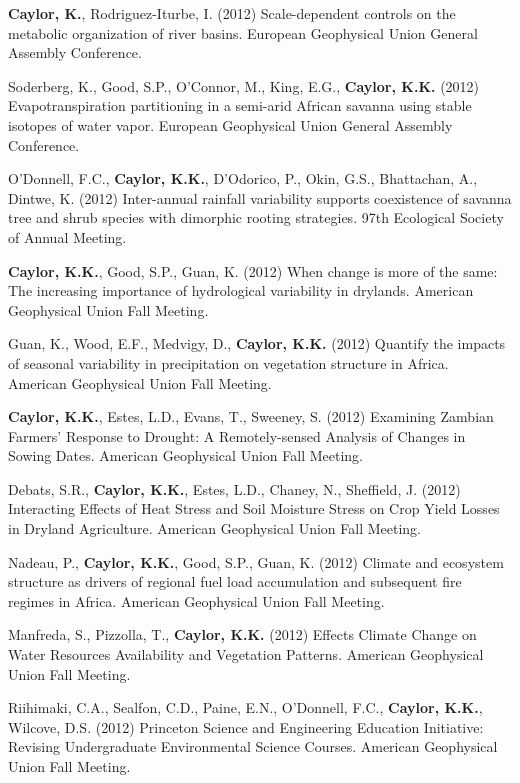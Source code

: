 \begin{etaremune}
\item \textbf{ Caylor, K.}, Rodriguez-Iturbe, I. (2012) Scale-dependent controls on the metabolic organization of river basins. European Geophysical Union General Assembly Conference.
\item Soderberg, K., Good, S.P., O'Connor, M., King, E.G., \textbf{ Caylor, K.K.} (2012) Evapotranspiration partitioning in a semi-arid African savanna using stable isotopes of water vapor. European Geophysical Union General Assembly Conference.
\item O'Donnell, F.C., \textbf{ Caylor, K.K.}, D'Odorico, P., Okin, G.S., Bhattachan, A., Dintwe, K. (2012) Inter-annual rainfall variability supports coexistence of savanna tree and shrub species with dimorphic rooting strategies. 97th Ecological Society of Annual Meeting.
\item \textbf{ Caylor, K.K.}, Good, S.P., Guan, K. (2012) When change is more of the same: The increasing importance of hydrological variability in drylands. American Geophysical Union Fall Meeting.
\item Guan, K., Wood, E.F., Medvigy, D., \textbf{ Caylor, K.K.} (2012) Quantify the impacts of seasonal variability in precipitation on vegetation structure in Africa. American Geophysical Union Fall Meeting.
\item \textbf{ Caylor, K.K.}, Estes, L.D., Evans, T., Sweeney, S. (2012) Examining Zambian Farmers' Response to Drought: A Remotely-sensed Analysis of Changes in Sowing Dates. American Geophysical Union Fall Meeting.
\item Debats, S.R., \textbf{ Caylor, K.K.}, Estes, L.D., Chaney, N., Sheffield, J. (2012) Interacting Effects of Heat Stress and Soil Moisture Stress on Crop Yield Losses in Dryland Agriculture. American Geophysical Union Fall Meeting.
\item Nadeau, P., \textbf{ Caylor, K.K.}, Good, S.P., Guan, K. (2012) Climate and ecosystem structure as drivers of regional fuel load accumulation and subsequent fire regimes in Africa. American Geophysical Union Fall Meeting.
\item Manfreda, S., Pizzolla, T., \textbf{ Caylor, K.K.} (2012) Effects Climate Change on Water Resources Availability and Vegetation Patterns. American Geophysical Union Fall Meeting.
\item Riihimaki, C.A., Sealfon, C.D., Paine, E.N., O'Donnell, F.C., \textbf{ Caylor, K.K.}, Wilcove, D.S. (2012) Princeton Science and Engineering Education Initiative: Revising Undergraduate Environmental Science Courses. American Geophysical Union Fall Meeting.

\end{etaremune}
